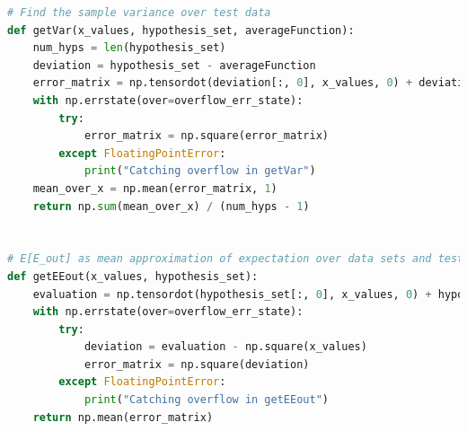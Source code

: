 \documentclass[12pt]{article}
\begin{document}
\begin{lstlisting}[language=Python, caption=experiement\_funcs.py]
# Find the sample variance over test data
def getVar(x_values, hypothesis_set, averageFunction):
    num_hyps = len(hypothesis_set)
    deviation = hypothesis_set - averageFunction
    error_matrix = np.tensordot(deviation[:, 0], x_values, 0) + deviation[:, 1:]
    with np.errstate(over=overflow_err_state):
        try:
            error_matrix = np.square(error_matrix)
        except FloatingPointError:
            print("Catching overflow in getVar")
    mean_over_x = np.mean(error_matrix, 1)
    return np.sum(mean_over_x) / (num_hyps - 1)


# E[E_out] as mean approximation of expectation over data sets and test data
def getEEout(x_values, hypothesis_set):
    evaluation = np.tensordot(hypothesis_set[:, 0], x_values, 0) + hypothesis_set[:, 1:]
    with np.errstate(over=overflow_err_state):
        try:
            deviation = evaluation - np.square(x_values)
            error_matrix = np.square(deviation)
        except FloatingPointError:
            print("Catching overflow in getEEout")
    return np.mean(error_matrix)
\end{lstlisting}
\end{document}
